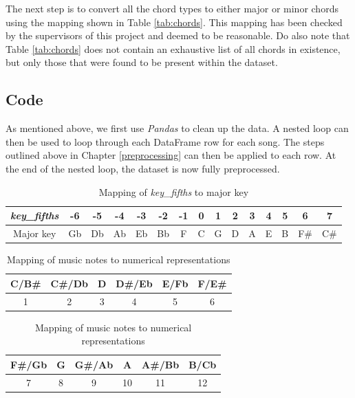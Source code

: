 The next step is to convert all the chord types to either major or minor chords using the mapping shown in Table \ref{tab:chords}. This mapping has been checked by the supervisors of this project and deemed to be reasonable. Do also note that Table \ref{tab:chords} does not contain an exhaustive list of all chords in existence, but only those that were found to be present within the dataset.

\subsection{Code}
As mentioned above, we first use \emph{Pandas} to clean up the data. A nested loop can then be used to loop through each DataFrame row for each song. The steps outlined above in Chapter \ref{preprocessing} can then be applied to each row. At the end of the nested loop, the dataset is now fully preprocessed.


    \begin{table}
        \caption{Mapping of \emph{key\_fifths} to major key}
        \label{tab:kf_map}
        \centering
        \begin{tabular}{|c||c|c|c|c|c|c|c|c|c|c|c|c|c|c|}
        \hline
        \emph{key\_fifths} & -6 & -5 & -4 & -3 & -2 & -1 & 0 & 1 & 2 & 3 & 4 & 5 & 6 & 7 \\
        \hline
        Major key & Gb & Db & Ab & Eb & Bb & F & C & G & D & A & E & B & F\# & C\# \\
        \hline
        \end{tabular}
        \end{table}

\begin{table}
    \caption{Mapping of music notes to numerical representations}
    \label{tab:note_map}
    \centering
    \begin{tabular}{|c|c|c|c|c|c|}
    \hline
    C/B\# & C\#/Db & D & D\#/Eb & E/Fb & F/E\# \\
    \hline
    1 & 2 & 3 & 4 & 5 & 6 \\
    \hline
    \end{tabular}
    \begin{tabular}{|c|c|c|c|c|c|}
        \hline
    F\#/Gb & G & G\#/Ab & A & A\#/Bb & B/Cb\\
    \hline
    7 & 8 & 9 & 10 & 11 & 12\\
    \hline
    \end{tabular}
    \end{table}

